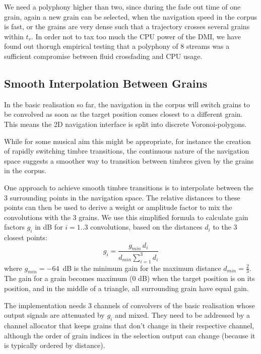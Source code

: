 We need a polyphony higher than two, since during the fade out time of one grain, again a new grain can be selected, when the navigation speed in the corpus is fast, or the grains are very dense such that a trajectory crosses several grains within $t_r$. In order not to tax too much the CPU power of the DMI, we have found out thorugh empirical testing that a polyphony of 8 streams was a sufficient compromise between fluid crossfading and CPU usage.

\subsection{Smooth Interpolation Between Grains}\label{sec:mix}

In the basic realisation so far, the navigation in the corpus will switch grains to be convolved as soon as the target position comes closest to a different grain.  
This means the 2D navigation interface is split into discrete Voronoi-polygons.

While for some musical aim this might be appropriate, for instance the creation of rapidly switching timbre transitions, the continuous nature of the navigation space suggests a smoother way to transition between timbres given by the grains in the corpus.

One approach to achieve smooth timbre transitions is to interpolate between the 3 surrounding points in the navigation space.  The relative distances to these points can then be used to derive a weight or amplitude factor \cite{FreedMacCallumSchmederWessel-nime2010-hybridization-interfaces} to mix the convolutions with the 3 grains.  We use this simplified formula to calculate gain factors $g_i$ in dB for $i = 1..3$ convolutions, based on the distances $d_i$ to the 3 closest points:
%
\begin{equation}
  g_i = \frac{g_{min} \, d_i}{d_{min} \sum_{i=1}^3 d_i}
\end{equation}
%
where $g_{min} = -64$~dB is the minimum gain for the maximum distance $d_{min} = \frac{2}{3}$.
The gain for a grain becomes maximum (0 dB) when the target position is on its position, and in the middle of a triangle, all surrounding grain have equal gain.

The implementation needs 3 channels of convolvers of the basic realisation whose output signals are attenuated by $g_i$ and mixed.  They need to be addressed by a channel allocator that keeps grains that don't change in their respective channel, although the order of grain indices in the selection output can change (because it is typically ordered by distance).

